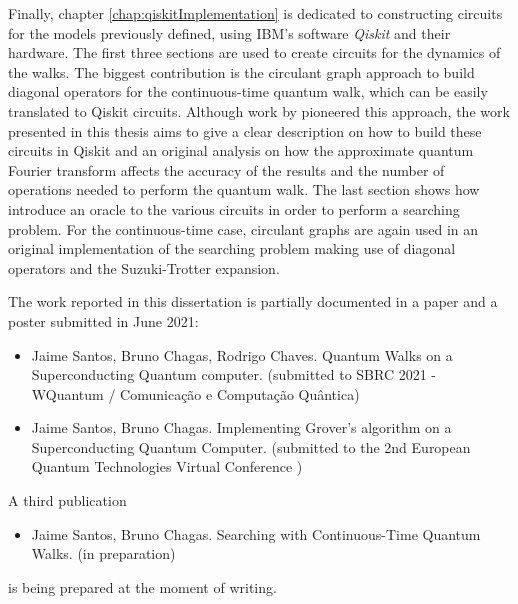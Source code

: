 \documentclass[../../dissertation.tex]{subfiles}
\begin{document}
Finally, chapter \ref{chap:qiskitImplementation} is dedicated to constructing
circuits for the models previously defined, using IBM's software
\textit{Qiskit} and their hardware. The first three sections are used to create
circuits for the dynamics of the walks. The biggest contribution is the
circulant graph approach to build diagonal operators for the continuous-time
quantum walk, which can be easily translated to Qiskit circuits. Although work
by \cite{qiang2016} pioneered this approach, the work presented in this thesis
aims to give a clear description on how to build these circuits in Qiskit and
an original analysis on how the approximate quantum Fourier transform affects
the accuracy of the results and the number of operations needed to perform the
quantum walk.
The last section shows how introduce an oracle to the various circuits in order
to perform a searching problem. For the continuous-time case, circulant graphs
are again used in an original implementation of the searching problem making
use of diagonal operators and the Suzuki-Trotter expansion.\par
The work reported in this dissertation is partially documented in a paper and a poster submitted in June 2021:
\begin{itemize}
	\item Jaime Santos, Bruno Chagas, Rodrigo Chaves. Quantum Walks on a Superconducting Quantum computer. (submitted to SBRC 2021 - WQuantum / Comunicação e Computação Quântica)
	\item Jaime Santos, Bruno Chagas. Implementing Grover's algorithm on a Superconducting Quantum Computer. (submitted to the 2nd European Quantum Technologies Virtual Conference )
\end{itemize}
A third publication
\begin{itemize}
    \item Jaime Santos, Bruno Chagas. Searching with Continuous-Time Quantum Walks. (in preparation)
\end{itemize}
is being prepared at the moment of writing.
\end{document}
